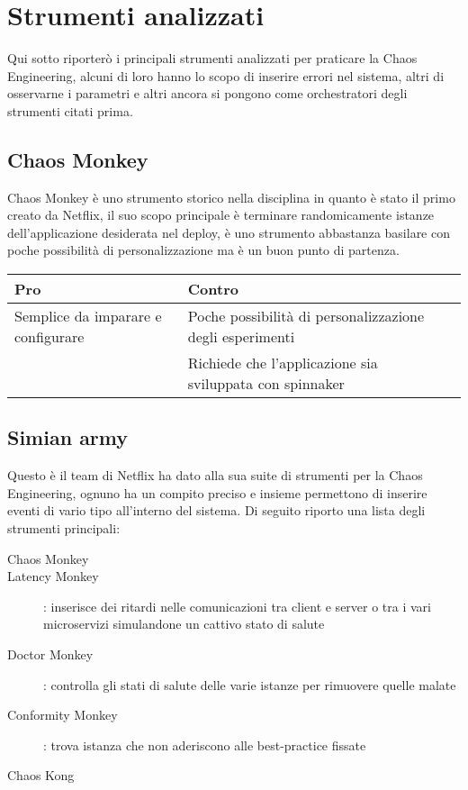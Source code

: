\section{Strumenti analizzati}
Qui sotto riporterò i principali strumenti analizzati per praticare la Chaos Engineering, alcuni di loro hanno lo scopo di inserire errori nel sistema, altri di osservarne i parametri e altri ancora si pongono come orchestratori degli strumenti citati prima.

\subsection{Chaos Monkey}
Chaos Monkey è uno strumento storico nella disciplina in quanto è stato il primo creato da Netflix, il suo scopo principale è terminare randomicamente istanze dell'applicazione desiderata nel deploy, è uno strumento abbastanza basilare con poche possibilità di personalizzazione ma è un buon punto di partenza.
\begin{center}%
    \label{tab:chaos-monkey}
    \begin{tabularx}{\textwidth}{lXl}
    \hline\hline
    \textbf{Pro} & \textbf{Contro}\\
    \hline
    Semplice da imparare e configurare & Poche possibilità di personalizzazione degli esperimenti \\
     & Richiede che l'applicazione sia sviluppata con \gls{spinnaker} \\
    \hline
    \end{tabularx}
\end{center}%

\subsection{Simian army}
Questo è il team di Netflix ha dato alla sua suite di strumenti per la Chaos Engineering, ognuno ha un compito preciso e insieme permettono di inserire eventi di vario tipo all'interno del sistema.
Di seguito riporto una lista degli strumenti principali:
\begin{description}
    \item[Chaos Monkey]
    \item[Latency Monkey]: inserisce dei ritardi nelle comunicazioni tra client e server o tra i vari microservizi simulandone un cattivo stato di salute
    \item[Doctor Monkey]: controlla gli stati di salute delle varie istanze per rimuovere quelle malate
    \item[Conformity Monkey]: trova istanza che non aderiscono alle best-practice fissate
    \item[Chaos Kong]  
\end{description}

